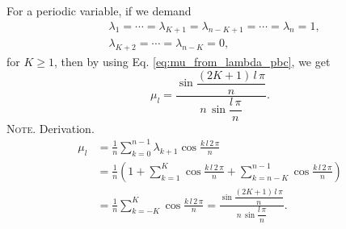 \documentclass[reprint, floatfix]{revtex4-1}
\newcommand{\note}[1]{{\color{DarkGreen}\footnotesize \textsc{Note.} #1}}
\begin{document}
For a periodic variable, if we demand
%
$$
\begin{aligned}
&
\lambda_1 = \cdots = \lambda_{K+1}
= \lambda_{n-K+1} = \cdots = \lambda_n = 1,
\\
&
\lambda_{K+2} = \cdots = \lambda_{n-K} = 0,
\end{aligned}
$$
for $K \ge 1$, then by using
Eq. \eqref{eq:mu_from_lambda_pbc},
we get
\begin{equation}
  \mu_l
  =
  \frac{
    \sin
    \dfrac{ (2 K + 1) \, l \, \pi }
         {              n        }
  }
  {
    n \, \sin \dfrac{ l \, \pi } { n }
  }
  .
  \label{eq:mu_sinc_pbc}
\end{equation}
\note{Derivation.
$$
\begin{aligned}
\mu_l
&=
\frac 1 n \sum_{k = 0}^{n-1} \lambda_{k+1} \cos \frac{ k \, l \, 2 \, \pi } { n }
\\
&=
\frac{1}{n}
\left(
  1 +
  \sum_{k=1}^K
  \cos \frac { k \, l \, 2 \, \pi } { n }
  +
  \sum_{k=n-K}^{n-1}
  \cos \frac { k \, l \, 2 \, \pi } { n }
\right)
\\
&=
\frac 1 n
\sum_{k=-K}^K
\cos \frac { k \, l \, 2 \, \pi } { n }
=
  \frac{
    \sin
    \dfrac{ (2 K + 1) \, l \, \pi }
         {              n        }
  }
  {
    n \, \sin \dfrac{ l \, \pi } { n }
  }
.
\end{aligned}
$$
}
\end{document}
